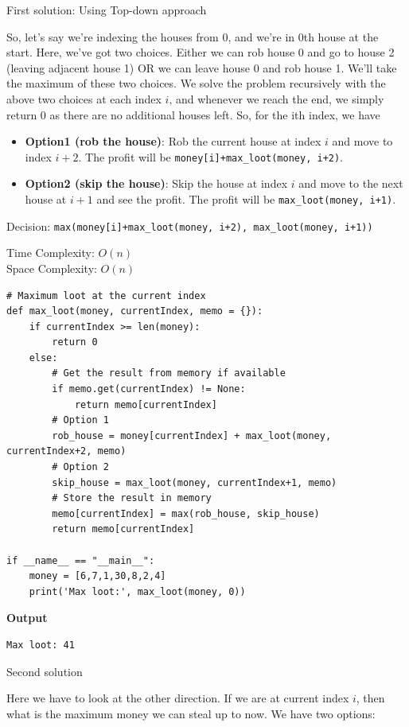 \documentclass[a4paper,11pt]{book}
\begin{document}
\noindent First solution: Using Top-down approach

\noindent So, let's say we're indexing the houses from 0, and we're in 0th house at the start. Here, we've got two choices. Either we can rob house 0 and go to house 2 (leaving adjacent house 1) OR we can leave house 0 and rob house 1. We'll take the maximum of these two choices. We solve the problem recursively with the above two choices at each index $i$, and whenever we reach the end, we simply return 0 as there are no additional houses left. So, for the ith index, we have

\begin{itemize}
\item \textbf{Option1 (rob the house)}: Rob the current house at index $i$ and move to index $i+2$. The profit will be \lstinline{money[i]+max_loot(money, i+2)}. 
\item \textbf{Option2 (skip the house)}: Skip the house at index $i$ and move to the next house at $i+1$ and see the profit. The profit will be \lstinline{max_loot(money, i+1)}.
\end{itemize}

\noindent Decision: \lstinline{max(money[i]+max_loot(money, i+2), max_loot(money, i+1))}

\noindent Time Complexity: $O(n)$\\
\noindent Space Complexity: $O(n)$

\begin{lstlisting}
# Maximum loot at the current index
def max_loot(money, currentIndex, memo = {}):
    if currentIndex >= len(money):
        return 0
    else:
        # Get the result from memory if available
        if memo.get(currentIndex) != None:
            return memo[currentIndex]
        # Option 1
        rob_house = money[currentIndex] + max_loot(money, currentIndex+2, memo)
        # Option 2
        skip_house = max_loot(money, currentIndex+1, memo)
        # Store the result in memory
        memo[currentIndex] = max(rob_house, skip_house)
        return memo[currentIndex]

if __name__ == "__main__":
    money = [6,7,1,30,8,2,4]
    print('Max loot:', max_loot(money, 0))
\end{lstlisting}
\textbf{Output}
\begin{lstlisting}
Max loot: 41
\end{lstlisting}

\noindent Second solution

\noindent Here we have to look at the other direction. If we are at current index $i$, then what is the maximum money we can steal up to now. We have two options:
\end{document}
